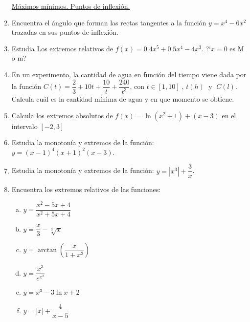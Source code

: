 \begin{enumerate}
		
	\underline{Máximos mínimos. Puntos de inflexión.}
	
		\item Encuentra el ángulo que forman las rectas tangentes a la función $y=x^4-6x^2$ trazadas en sus puntos de inflexión.
		
		\rightline{\textcolor{gris}{Solución: $14.83^o$}}
		
		\item Estudia Los extremos relativos de $f(x)=0.4x^5+0.5x^4-4x^3$. ?`$x=0$ es M o m?
		
		\rightline{\textcolor{gris}{Solución: $M(-3,51.3); \; I(0,0); \; m(3,-11.2)$}}
		
		\item En un experimento, la cantidad de agua en función del tiempo viene dada por la función $C(t)=\dfrac 2 3 + 10t+ \dfrac {10}{t}+\dfrac {240}{t^3}$, con $t\in [1,10]\; $, $t(h)\; $ y $\; C(l)$. Calcula cuál es la cantidad mínima de agua y en que momento se obtiene.
		
		
		\item Calcula los extremos absolutos de $f(x)=\ln (x^2+1) + (x-3) $ en el intervalo $[-2,3]$
		
		\rightline{\textcolor{gris}{Solución: $m_A(-2, \ln5 - 5); \; M_A(3,\ln 10)$}}
		
		\item Estudia la monotonía y extremos de la función: $y=(x-1)^4 (x+1)^2 (x-3)$.
		
		\rightline{\textcolor{gris}{Solución:$M(-1,0);\; m(-3.76,-4.7); \; M(1,0); \; m(12.15,-12)$}}
		
		\item Estudia la monotonía y extremos de la función: $y=|x^3|+\dfrac 3 x$.
		
		
		
		\item Encuentra los extremos relativos de las funciones:
		
		\begin{multicols}{2}
		\begin{enumerate}[a) ]
		\item $y=\dfrac{x^2-5x+4}{x^2+5x+4}$
		\item $y=\dfrac x 3 - \sqrt[3]{x}$
		\item $y= \arctan \left(\dfrac {x}{1+x^2} \right)$
		\item $y= \dfrac {x^3}{e^{x^2}}$
		\item $y= x^3-3\ln x + 2$
		\item $y= |x|+\dfrac {4}{x-5}$
		\end{enumerate}	
		\end{multicols}


\end{enumerate}
